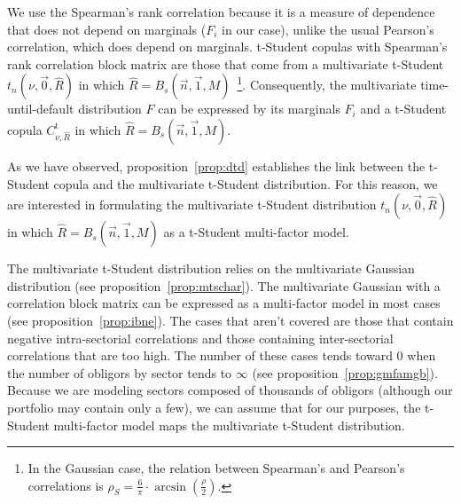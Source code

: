\documentclass[11pt,fleqn]{book} %
\begin{document}
We use the Spearman's rank correlation because it is a measure of dependence 
that does not depend on marginals ($F_i$ in our case), unlike the usual
Pearson's correlation, which does depend on marginals. t-Student copulas 
with Spearman's rank correlation block matrix are those that come from a 
multivariate t-Student $t_n(\nu,\vec{0},\widehat{R})$ in which 
$\widehat{R} = B_s(\vec{n},\vec{1},M)$~\footnote{ In the Gaussian case, the 
relation between Spearman's and Pearson's correlations is 
$\rho_S = \frac{6}{\pi}\cdot \arcsin(\frac{\rho}{2})$.}. Consequently, 
the multivariate time-until-default distribution $F$ can be expressed by 
its marginals $F_i$ and a t-Student copula $C_{\nu,\widehat{R}}^{\text{t}}$ 
in which $\widehat{R} = B_s(\vec{n},\vec{1},M)$.

As we have observed, proposition~\ref{prop:dtd} establishes the link between 
the t-Student copula and the multivariate t-Student distribution. For this 
reason, we are interested in formulating the multivariate t-Student distribution 
$t_n(\nu,\vec{0},\widehat{R})$ in which $\widehat{R} = B_s(\vec{n},\vec{1},M)$ 
as a t-Student multi-factor model.

The multivariate t-Student distribution relies on the multivariate Gaussian
distribution (see proposition~\ref{prop:mtschar}). The multivariate Gaussian 
with a correlation block matrix can be expressed as a multi-factor model in 
most cases (see proposition~\ref{prop:ibne}). The cases that aren't covered 
are those that contain negative intra-sectorial correlations and those 
containing inter-sectorial correlations that are too high. The number of these 
cases tends toward $0$ when the number of obligors by sector tends to $\infty$ 
(see proposition~\ref{prop:gmfamgb}). Because we are modeling sectors composed 
of thousands of obligors (although our portfolio may contain only a few), we 
can assume that for our purposes, the t-Student multi-factor model maps the 
multivariate t-Student distribution.
\end{document}
